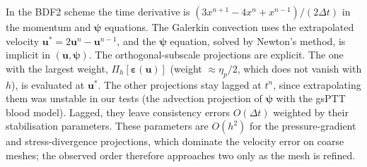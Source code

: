 In the BDF2 scheme the time derivative is
$(3x^{n+1}-4x^n+x^{n-1})/(2\Delta t)$ in the momentum and $\boldsymbol{\psi}$
equations. The Galerkin convection uses the extrapolated velocity
$\boldsymbol{u}^\ast=2\boldsymbol{u}^n-\boldsymbol{u}^{n-1}$, and the
$\boldsymbol{\psi}$ equation, solved by Newton's method, is implicit in
$(\boldsymbol{u},\boldsymbol{\psi})$. The orthogonal-subscale projections are
explicit. The one with the largest weight, $\Pi_h[\boldsymbol{\varepsilon}(\boldsymbol{u})]$
(weight $\approx\eta_p/2$, which does not vanish with $h$), is evaluated at
$\boldsymbol{u}^\ast$. The other projections stay lagged at $t^n$, since extrapolating them was
unstable in our tests (the advection projection of $\boldsymbol{\psi}$ with the gsPTT
blood model). Lagged, they leave consistency errors $O(\Delta t)$ weighted by
their stabilisation parameters. These parameters are $O(h^2)$ for the pressure-gradient and
stress-divergence projections, which dominate the velocity error on coarse
meshes; the observed order therefore approaches two only as the mesh is
refined.



